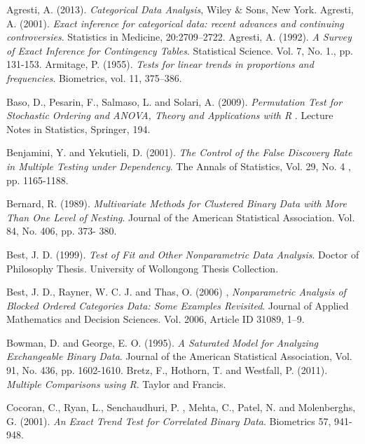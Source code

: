 \documentclass[12pt,oneside]{report}
\theoremstyle{definition}
\theoremstyle{mystyle}
\begin{document}
\begin{thebibliography}{99}

Agresti, A. (2013). \emph{Categorical Data Analysis}, Wiley $\&$ Sons, New York.
Agresti, A. (2001). \emph{Exact inference for categorical data: recent advances and continuing controversies}. Statistics in Medicine, 20:2709–2722.
Agresti, A. (1992). \emph{A Survey of Exact Inference for Contingency Tables}. Statistical Science. Vol. 7, No. 1., pp. 131-153.
Armitage, P. (1955). \emph{Tests for linear trends in proportions and frequencies}. Biometrics, vol. 11, 375–386.

Baso, D., Pesarin, F., Salmaso, L. and Solari, A. (2009). \emph{Permutation Test for Stochastic Ordering and ANOVA, Theory and Applications with R  }. Lecture Notes in Statistics, Springer, 194.



Benjamini, Y. and  Yekutieli, D. (2001).\emph{ The Control of the False Discovery Rate in Multiple Testing under Dependency}. The Annals of Statistics, Vol. 29, No. 4 , pp. 1165-1188.

Bernard, R. (1989). \emph{Multivariate Methods for Clustered Binary Data with More Than One Level of Nesting}. Journal of the American Statistical Association. Vol. 84, No. 406,  pp. 373- 380.

Best, J. D. (1999). \emph{Test of Fit and Other Nonparametric Data Analysis}.  Doctor of Philosophy Thesis. University of Wollongong Thesis Collection.

Best, J. D., Rayner, W. C. J. and Thas, O. (2006) ,\emph{ Nonparametric Analysis of Blocked Ordered Categories Data: Some Examples Revisited}. Journal of Applied Mathematics and Decision Sciences. Vol. 2006, Article ID 31089,  1–9.


Bowman, D. and  George, E. O. (1995). \emph{A Saturated Model for Analyzing Exchangeable Binary Data}. Journal of the American Statistical Association, Vol. 91, No. 436, pp. 1602-1610.
Bretz, F., Hothorn, T. and Westfall, P. (2011). \emph{Multiple Comparisons using  R}. Taylor and Francis.


Cocoran, C., Ryan, L., Senchaudhuri, P. , Mehta, C., Patel, N. and  Molenberghs, G. (2001). \emph{An Exact Trend Test for Correlated Binary Data}. Biometrics 57, 941-948.


\end{thebibliography}
\end{document}
